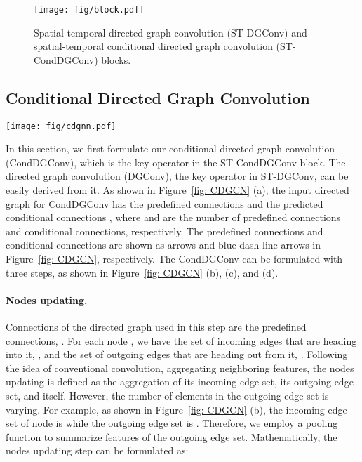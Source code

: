 \documentclass[sigconf]{acmart}
\begin{document}
\begin{figure}[!t] 
	\centering
	\texttt{[image: fig/block.pdf]}
	\vspace{-3mm}
	\caption{
		Spatial-temporal directed graph convolution (ST-DGConv) and spatial-temporal conditional directed graph convolution (ST-CondDGConv) blocks.
	}
	\vspace{-5mm}
	\label{fig: ST-CondDGConv}
\end{figure} 



\subsection{Conditional Directed Graph Convolution}
\label{sec: CondDGConv}

\begin{figure*}[!t] 
	\centering
	\texttt{[image: fig/cdgnn.pdf]}
	\vspace{-3mm}
	\caption{
		Conditional directed graph convolution (CondDGConv). Part (a) is the input directed graph with predefined connections () and predicted conditional connections (Cond). Part (b), (c) and (d) are three steps of the CondDGConv.
	}
	\vspace{-3mm}
	\label{fig: CDGCN}
\end{figure*} 
In this section, we first formulate our conditional directed graph convolution (CondDGConv), which is the key operator in the ST-CondDGConv block.
The directed graph convolution (DGConv), the key operator in ST-DGConv, can be easily derived from it.
As shown in Figure~\ref{fig: CDGCN} (a), the input directed graph for CondDGConv has the predefined connections  and the predicted conditional connections , where  and  are the number of predefined connections and conditional connections, respectively.
The predefined connections and conditional connections are shown as arrows and blue dash-line arrows in Figure~\ref{fig: CDGCN}, respectively.
The CondDGConv can be formulated with three steps, as shown in Figure~\ref{fig: CDGCN} (b), (c), and (d).






\vspace{-2mm}
\paragraph{Nodes updating.}
Connections of the directed graph used in this step are the predefined connections, .
For each node , we have the set of incoming edges that are heading into it, , and the set of outgoing edges that are heading out from it, .
Following the idea of conventional convolution, aggregating neighboring features, the nodes updating is defined as the aggregation of its incoming edge set, its outgoing edge set, and itself.
However, the number of elements in the outgoing edge set is varying. For example, as shown in Figure~\ref{fig: CDGCN} (b), the incoming edge set of node  is  while the outgoing edge set is .
Therefore, we employ a pooling function to summarize features of the outgoing edge set.
Mathematically, the nodes updating step can be formulated as:
 
\end{document}
